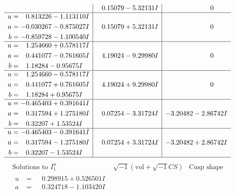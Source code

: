 \documentclass[1p]{elsarticle_modified}
\theoremstyle{definition}
\newcommand{\I}{\sqrt{-1}}
\begin{document}
$$\begin{array}{c|c|c}
 & \phantom{-}0.15079 - 5.32131 I & \phantom{-0.000000 } 0 \\ \hline\begin{aligned}
u &= \phantom{-}0.813226 - 1.113110 I \\
a &= -0.030267 - 0.875027 I \\
b &= -0.859728 - 1.100540 I\end{aligned}
 & \phantom{-}0.15079 + 5.32131 I & \phantom{-0.000000 } 0 \\ \hline\begin{aligned}
u &= \phantom{-}1.254660 + 0.578117 I \\
a &= \phantom{-}0.441077 - 0.761605 I \\
b &= \phantom{-}1.18284 - 0.95675 I\end{aligned}
 & \phantom{-}4.19024 - 9.29980 I & \phantom{-0.000000 } 0 \\ \hline\begin{aligned}
u &= \phantom{-}1.254660 - 0.578117 I \\
a &= \phantom{-}0.441077 + 0.761605 I \\
b &= \phantom{-}1.18284 + 0.95675 I\end{aligned}
 & \phantom{-}4.19024 + 9.29980 I & \phantom{-0.000000 } 0 \\ \hline\begin{aligned}
u &= -0.465403 + 0.391641 I \\
a &= \phantom{-}0.317594 + 1.275180 I \\
b &= \phantom{-}0.32207 + 1.53524 I\end{aligned}
 & \phantom{-}0.07254 - 3.31724 I & -3.20482 - 2.86742 I \\ \hline\begin{aligned}
u &= -0.465403 - 0.391641 I \\
a &= \phantom{-}0.317594 - 1.275180 I \\
b &= \phantom{-}0.32207 - 1.53524 I\end{aligned}
 & \phantom{-}0.07254 + 3.31724 I & -3.20482 + 2.86742 I\\
 \hline 
 \end{array}$$\newpage$$\begin{array}{c|c|c}  
\text{Solutions to }I^u_{1}& \I (\text{vol} + \sqrt{-1}CS) & \text{Cusp shape}\\
 \hline 
\begin{aligned}
u &= \phantom{-}0.298915 + 0.526501 I \\
a &= \phantom{-}0.324718 - 1.103420 I \\

\end{aligned}
\end{array}$$
\end{document}

